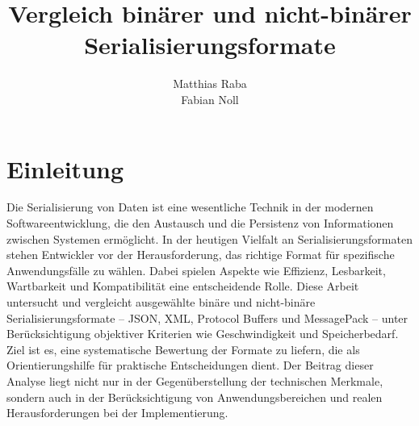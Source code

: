 \documentclass[ngerman]{seminarvorlage}
\begin{document}
\title{Vergleich binärer und nicht-binärer Serialisierungsformate}
\author{
  \alignauthor Matthias Raba \\
  \alignauthor Fabian Noll\\
}

\maketitle%




\section{Einleitung}
Die Serialisierung von Daten ist eine wesentliche Technik in der modernen Softwareentwicklung, die den Austausch und die Persistenz von Informationen zwischen Systemen ermöglicht. In der heutigen Vielfalt an Serialisierungsformaten stehen Entwickler vor der Herausforderung, das richtige Format für spezifische Anwendungsfälle zu wählen. Dabei spielen Aspekte wie Effizienz, Lesbarkeit, Wartbarkeit und Kompatibilität eine entscheidende Rolle. Diese Arbeit untersucht und vergleicht ausgewählte binäre und nicht-binäre Serialisierungsformate – JSON, XML, Protocol Buffers und MessagePack – unter Berücksichtigung objektiver Kriterien wie Geschwindigkeit und Speicherbedarf. Ziel ist es, eine systematische Bewertung der Formate zu liefern, die als Orientierungshilfe für praktische Entscheidungen dient. Der Beitrag dieser Analyse liegt nicht nur in der Gegenüberstellung der technischen Merkmale, sondern auch in der Berücksichtigung von Anwendungsbereichen und realen Herausforderungen bei der Implementierung.
\end{document}
